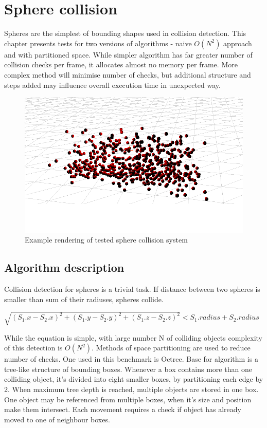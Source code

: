 \chapter{Sphere collision}
\label{cha:spherecollision}

Spheres are the simplest of bounding shapes used in collision detection. This chapter presents tests for two versions of algorithms - naive $O(N^2)$ approach and with partitioned space. While simpler algorithm has far greater number of collision checks per frame, it allocates almost no memory per frame. More complex method will minimise number of checks, but additional structure and steps added may influence overall execution time in unexpected way.


\begin{figure}[h!]
  \caption{Example rendering of tested sphere collision system}
  \label{img:spheres}
  \centering
	\includegraphics[width=16cm]{spheres/render.png}
\end{figure}

\section{Algorithm description}
\label{sec:spherealgorithmdescription}

Collision detection for spheres is a trivial task. If distance between two spheres is smaller than sum of their radiuses, spheres collide.

$\sqrt{(S_1.x - S_2.x)^2 + (S_1.y - S_2.y)^2 + (S_1.z - S_2.z)^2} < S_1.radius + S_2.radius$

While the equation is simple, with large number N of colliding objects complexity of this detection is $O(N^2)$. Methods of space partitioning are used to reduce number of checks. One used in this benchmark is Octree.
Base for algorithm is a tree-like structure of bounding boxes. Whenever a box contains more than one colliding object, it's divided into eight smaller boxes, by partitioning each edge by 2. When maximum tree depth is reached, multiple objects are stored in one box. One object may be referenced from multiple boxes, when it's size and position make them intersect. Each movement requires a check if object has already moved to one of neighbour boxes.

